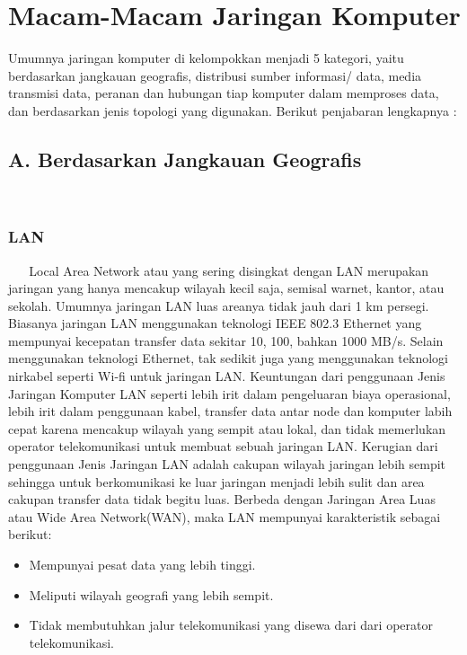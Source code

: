 \section{Macam-Macam Jaringan Komputer}
  Umumnya jaringan komputer di kelompokkan menjadi 5 kategori, yaitu berdasarkan jangkauan geografis, distribusi sumber informasi/ data, media transmisi data, peranan dan hubungan tiap komputer dalam memproses data, dan berdasarkan jenis topologi yang digunakan. Berikut penjabaran lengkapnya :
  \subsection{A. Berdasarkan Jangkauan Geografis}
    \subsubsection{LAN} 
      Local Area Network atau yang sering disingkat dengan LAN merupakan jaringan yang hanya mencakup wilayah kecil saja, semisal warnet, kantor, atau sekolah. Umumnya jaringan LAN luas areanya tidak jauh dari 1 km persegi.
    Biasanya jaringan LAN menggunakan teknologi IEEE 802.3 Ethernet yang mempunyai kecepatan transfer data sekitar 10, 100, bahkan 1000 MB/s. Selain menggunakan teknologi Ethernet, tak sedikit juga yang menggunakan teknologi nirkabel seperti Wi-fi untuk jaringan LAN.
    Keuntungan dari penggunaan Jenis Jaringan Komputer LAN seperti lebih irit dalam pengeluaran biaya operasional, lebih irit dalam penggunaan kabel, transfer data antar node dan komputer labih cepat karena mencakup wilayah yang sempit atau lokal, dan tidak memerlukan operator telekomunikasi untuk membuat sebuah jaringan LAN.
    Kerugian dari penggunaan Jenis Jaringan LAN adalah cakupan wilayah jaringan lebih sempit sehingga untuk berkomunikasi ke luar jaringan menjadi lebih sulit dan area cakupan transfer data tidak begitu luas.
    Berbeda dengan Jaringan Area Luas atau Wide Area Network(WAN), maka LAN mempunyai karakteristik sebagai berikut:
    \begin{itemize}
    \item Mempunyai pesat data yang lebih tinggi.
    \item Meliputi wilayah geografi yang lebih sempit.
    \item Tidak membutuhkan jalur telekomunikasi yang disewa dari dari operator telekomunikasi.
    \end{itemize}
